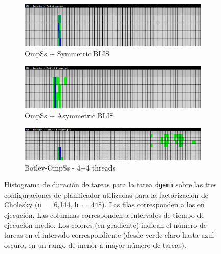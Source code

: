 \begin{figure}%
\centering
	\begin{subfigure}{\textwidth}
   \includegraphics[width=\textwidth]{Plots/Traces/sym_task_duration_histogram.png}
 \caption{OmpSs + Symmetric BLIS}
	\end{subfigure}
	\begin{subfigure}{\textwidth}
   \includegraphics[width=\textwidth]{Plots/Traces/asym_task_duration_histogram.png}
		\caption{OmpSs + Asymmetric BLIS}
	\end{subfigure}
	\begin{subfigure}{\textwidth}
   \includegraphics[width=\textwidth]{Plots/Traces/botlev_task_duration_histogram.png}
 \caption{Botlev-OmpSs - 4+4 threads}
	\end{subfigure}
\caption{Histograma de duración de tareas para la tarea {\tt dgemm} sobre las tres configuraciones de planificador utilizadas para la factorización de Cholesky ({\tt n}~=~6,144, {\tt b}~=~448).  
	Las filas corresponden a los \wts en ejecución. Las columnas corresponden a intervalos de tiempo de ejecución medio. Los colores (en gradiente) indican el número de tareas en el 
	intervalo correspondiente (desde verde claro hasta azul oscuro, en un rango de menor a mayor número de tareas).}
\label{fig:traces_task_duration}
\end{figure}


